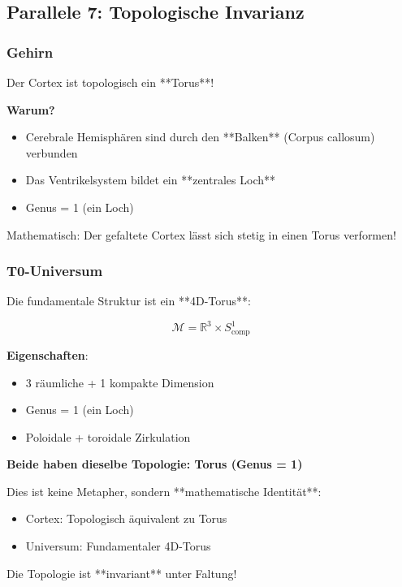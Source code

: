 	\subsection{Parallele 7: Topologische Invarianz}
	
	\subsubsection{Gehirn}
	
	Der Cortex ist topologisch ein **Torus**!
	
	\textbf{Warum?}
	\begin{itemize}
		\item Cerebrale Hemisphären sind durch den **Balken** (Corpus callosum) verbunden
		\item Das Ventrikelsystem bildet ein **zentrales Loch**
		\item Genus = 1 (ein Loch)
	\end{itemize}
	
	Mathematisch: Der gefaltete Cortex lässt sich stetig in einen Torus verformen!
	
	\subsubsection{T0-Universum}
	
	Die fundamentale Struktur ist ein **4D-Torus**:
	
	\begin{equation}
		\mathcal{M} = \mathbb{R}^3 \times S^1_{\text{comp}}
	\end{equation}
	
	\textbf{Eigenschaften}:
	\begin{itemize}
		\item 3 räumliche + 1 kompakte Dimension
		\item Genus = 1 (ein Loch)
		\item Poloidale + toroidale Zirkulation
	\end{itemize}
	
	\begin{keyresult}
		\textbf{Beide haben dieselbe Topologie: Torus (Genus = 1)}
		
		Dies ist keine Metapher, sondern **mathematische Identität**:
		
		\begin{itemize}
			\item Cortex: Topologisch äquivalent zu Torus
			\item Universum: Fundamentaler 4D-Torus
		\end{itemize}
		
		Die Topologie ist **invariant** unter Faltung!
	\end{keyresult}
	
